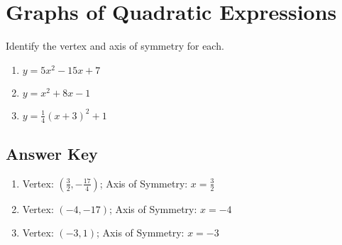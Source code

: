\chapter{Graphs of Quadratic Expressions}

Identify the vertex and axis of symmetry for each.

\begin{multicols}{3}
\begin{enumerate}   
    \item $y = 5x^2 - 15x + 7$
    \item $y = x^2 + 8x - 1$
    \item $y = \frac{1}{4}\left(x+3\right)^2 + 1$
\end{enumerate} \setcounter{Review}{\value{enumi}}
\end{multicols}

\newpage


\section{Answer Key}

\begin{enumerate}
	\item Vertex: $\left(\frac{3}{2}, -\frac{17}{4}\right)$; \quad Axis of Symmetry: $x = \frac{3}{2}$
    \item Vertex: $(-4,-17)$; \quad Axis of Symmetry: $x = -4$
    \item Vertex: $(-3,1)$; \quad Axis of Symmetry: $x = -3$
\end{enumerate}
